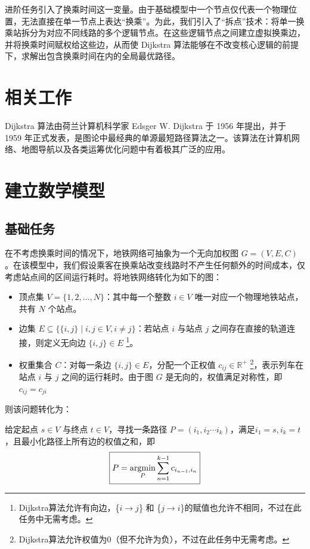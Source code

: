 	进阶任务引入了换乘时间这一变量。由于基础模型中一个节点仅代表一个物理位置，无法直接在单一节点上表达“换乘”。为此，我们引入了“拆点”技术：将单一换乘站拆分为对应不同线路的多个逻辑节点。在这些逻辑节点之间建立虚拟换乘边，并将换乘时间赋权给这些边，从而使 Dijkstra 算法能够在不改变核心逻辑的前提下，求解出包含换乘时间在内的全局最优路径。
	
	\section{相关工作}
	Dijkstra 算法由荷兰计算机科学家 Edsger W. Dijkstra 于 1956 年提出，并于 1959 年正式发表，是图论中最经典的单源最短路径算法之一。该算法在计算机网络、地图导航以及各类运筹优化问题中有着极其广泛的应用。
	
	\section{建立数学模型}
	
	\subsection{基础任务}
	
	在不考虑换乘时间的情况下，地铁网络可抽象为一个无向加权图 $G = (V, E, C)$。在该模型中，我们假设乘客在换乘站改变线路时不产生任何额外的时间成本，仅考虑站点间的区间运行耗时。将地铁网络转化为如下的图：
	
	\begin{itemize}
	\item 顶点集 $V = \{1, 2, \dots, N\}$：其中每一个整数 $i \in V$ 唯一对应一个物理地铁站点，共有 $N$ 个站点。
	
	\item 边集 $E \subseteq \{ \{i, j\} \mid i, j \in V, i \neq j \}$：若站点 $i$ 与站点 $j$ 之间存在直接的轨道连接，则定义无向边 $\{i, j\} \in E$ \footnote{Dijkstra算法允许有向边，\{$i \to j$\} 和 \{$j \to i$\}的赋值也允许不相同，不过在此任务中无需考虑。}。
	
	\item 权重集合 $C$：对每一条边 $\{i, j\} \in E$，分配一个正权值 $c_{ij} \in \mathbb{R}^+$ \footnote{Dijkstra算法允许权值为0（但不允许为负），不过在此任务中无需考虑。}，表示列车在站点 $i$ 与 $j$ 之间的运行耗时。由于图 $G$ 是无向的，权值满足对称性，即 $c_{ij} = c_{ji}$
	\end{itemize}
	
	则该问题转化为：
	
	给定起点 $s \in V$ 与终点 $t \in V$，寻找一条路径 $P = (i_1, i_2 \cdots i_k)$，满足$i_1 = s, i_k = t$，且最小化路径上所有边的权值之和，即$$ \boxed{P = \operatorname*{argmin}_{P} \sum_{n=1}^{k-1} c_{i_{n-1}, i_n}}$$
	
